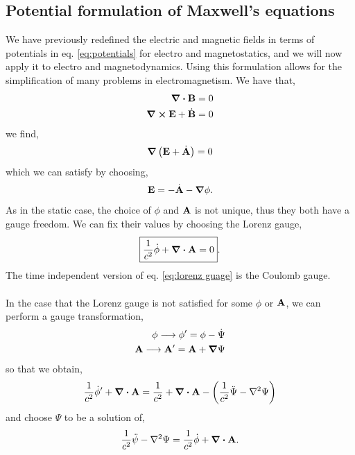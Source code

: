 \documentclass{book}
\begin{document}
\subsection{Potential formulation of Maxwell's equations}
We have previously redefined the electric and magnetic fields in terms of potentials in eq. \eqref{eq:potentials} for electro and magnetostatics, and we will now apply it to electro and magnetodynamics. Using this formulation allows for the simplification of many problems in electromagnetism. We have that,
\begin{align}
	\div{\vb{B}} = 0 \\
	\curl{\vb{E}}+\Dot{\vb{B}} = 0
\end{align}
we find,
\begin{equation}
	\grad{\left(\vb{E} + \Dot{\vb{A}}\right)} = 0 
\end{equation}
which we can satisfy by choosing,
\begin{equation}
	\vb{E}= - \Dot{\vb{A}} - \grad \phi.
\end{equation}
As in the static case, the choice of $\phi$ and $\vb{A}$ is not unique, thus they both have a gauge freedom. We can fix their values by choosing the Lorenz gauge,
\begin{equation}
	\boxed{\frac{1}{c^2}\Dot{\phi} + \div{\vb{A}} = 0}. \label{eq:lorenz guage}
\end{equation}
The time independent version of eq. \eqref{eq:lorenz guage} is the Coulomb gauge.
\\\\
In the case that the Lorenz gauge is not satisfied for some $\phi$ or $\vb{A}$, we can perform a gauge transformation,
\begin{align}
	\phi \longrightarrow \phi' = \phi - \Dot{\Psi} \\
	\vb{A} \longrightarrow \vb{A}' = \vb{A} + \grad{\Psi}
\end{align}
so that we obtain,
\begin{equation}
	\frac{1}{c^2}\Dot{\phi}' + \div{\vb{A}} = \frac{1}{c^2}+\div{\vb{A}} - \left(\frac{1}{c^2}\ddot{\Psi} - \laplacian\Psi\right)
\end{equation}
and choose $\Psi$ to be a solution of,
\begin{equation}
	\frac{1}{c^2}\Ddot{\psi}-\laplacian\Psi = \frac{1}{c^2}\Dot{\phi} + \div{\vb{A}}.
\end{equation}
\end{document}
